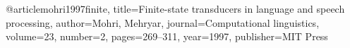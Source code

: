 @article{mohri1997finite,
  title={Finite-state transducers in language and speech processing},
  author={Mohri, Mehryar},
  journal={Computational linguistics},
  volume={23},
  number={2},
  pages={269--311},
  year={1997},
  publisher={MIT Press}
}


%
%
